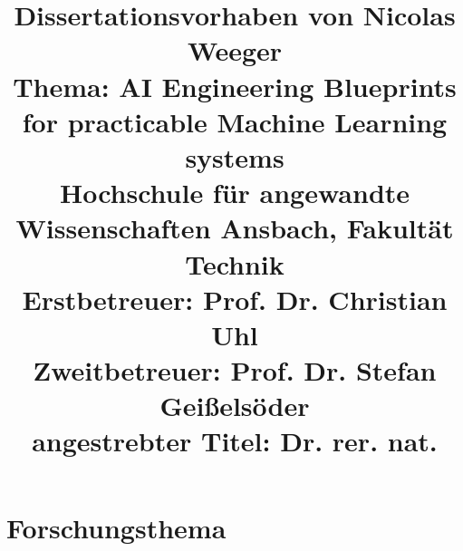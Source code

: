 \documentclass[11pt,a4paper,pointlessnumbers]{scrartcl}
\renewcommand{\normalsize}{\fontsize{11pt}{13.2pt}\selectfont}
\theoremstyle{break}
\numberwithin{equation}{section}
\begin{document}
\pagestyle{fancy}
\fancyhf{}
\fancyhead[L]{\textit{\nouppercase{\leftmark}}}
\fancyhead[R]{\thepage}
\date{}
\title{\textbf{Dissertationsvorhaben von Nicolas Weeger}
\\{Thema: AI Engineering Blueprints for practicable Machine Learning systems}
\\{\normalsize Hochschule für angewandte Wissenschaften Ansbach, Fakultät Technik}
\\{\normalsize Erstbetreuer: Prof. Dr. Christian Uhl}\vspace{-.5em}
\\{\normalsize Zweitbetreuer: Prof. Dr. Stefan Geißelsöder}
\\{\normalsize angestrebter Titel: Dr. rer. nat.}}
\maketitle
\vspace{-14ex}

\thispagestyle{empty}
\section{Forschungsthema} \label{kap:motivation}
\end{document}
